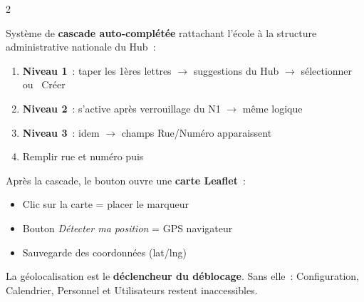 \begin{multicols}{2}
\columnbreak


{\scriptsize Syst\`eme de \textbf{cascade auto-compl\'et\'ee} rattachant l'\'ecole \`a la structure administrative nationale du Hub~:}

\begin{center}
\end{center}

\begin{stepbox}[title={\faIcon{map-marker-alt}\ Configurer la localisation}]
\begin{enumerate}[label=\textcolor{indigo}{\scriptsize\textbf{\arabic*.}},font=\scriptsize,itemsep=0pt]
  \item \textbf{Niveau 1}~: taper les 1\`eres lettres $\to$ suggestions du Hub $\to$ s\'electionner ou \textcolor{emerald}{\faPlus\ Cr\'eer}
  \item \textbf{Niveau 2}~: s'active apr\`es verrouillage du N1 $\to$ m\^eme logique
  \item \textbf{Niveau 3}~: idem $\to$ champs Rue/Num\'ero apparaissent
  \item Remplir rue et num\'ero puis 
\end{enumerate}
\end{stepbox}


{\scriptsize Apr\`es la cascade, le bouton  ouvre une \textbf{carte Leaflet}~:}
\begin{itemize}[font=\scriptsize,itemsep=0pt]
  \item Clic sur la carte = placer le marqueur
  \item Bouton \textit{D\'etecter ma position} = GPS navigateur
  \item Sauvegarde des coordonn\'ees (lat/lng)
\end{itemize}

\begin{warnbox}
\scriptsize La g\'eolocalisation est le \textbf{d\'eclencheur du d\'eblocage}. Sans elle~: Configuration, Calendrier, Personnel et Utilisateurs restent inaccessibles.
\end{warnbox}

\end{multicols}

